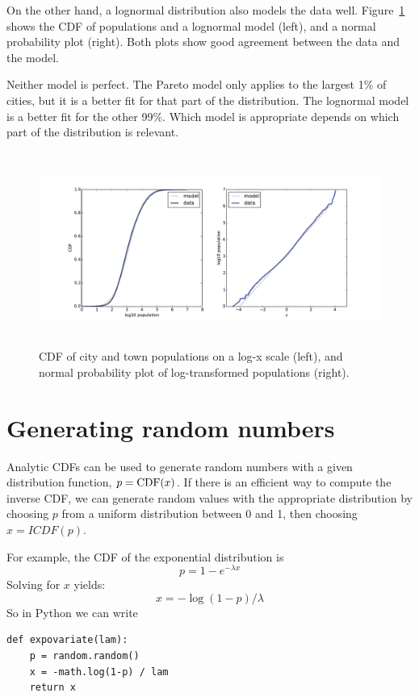\documentclass[12pt]{book}
\begin{document}
On the other hand, a lognormal distribution also models the data well.
Figure~\ref{populations_normal} shows the CDF of populations and a
lognormal model (left), and a normal probability plot (right).  Both
plots show good agreement between the data and the model.

Neither model is perfect.
The Pareto model only applies to the largest 1\% of cities, but it
is a better fit for that part of the distribution.  The lognormal
model is a better fit for the other 99\%.
Which model is appropriate depends on which part of the distribution
is relevant.

\begin{figure}
\centerline{\includegraphics[height=2.5in]{figs/populations_normal.pdf}}
\caption{CDF of city and town populations on a log-x scale (left), and
normal probability plot of log-transformed populations (right).}
\label{populations_normal}
\end{figure}


\section{Generating random numbers}

Analytic CDFs can be used to generate random numbers with a given
distribution function, $p = \mathrm{CDF}(x)$.  If there is an efficient way to
compute the inverse CDF, we can generate random values
with the appropriate distribution by choosing $p$ from a uniform
distribution between 0 and 1, then choosing
$x = ICDF(p)$.

For example, the CDF of the exponential distribution is
%
\[ p = 1 - e^{-\lambda x} \]
%
Solving for $x$ yields:
%
\[ x = -\log (1 - p) / \lambda \]
%
So in Python we can write
%
\begin{verbatim}
def expovariate(lam):
    p = random.random()
    x = -math.log(1-p) / lam
    return x
\end{verbatim}
\end{document}
